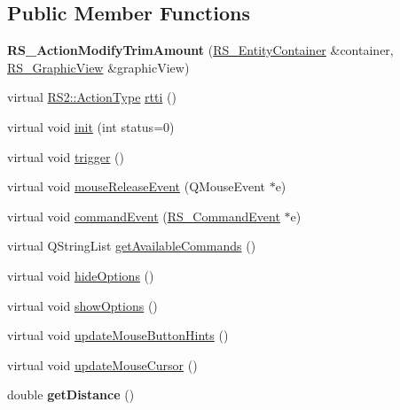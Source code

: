 \subsection*{Public Member Functions}
\begin{DoxyCompactItemize}
\item 
\hypertarget{classRS__ActionModifyTrimAmount_ab89a9caa5cfcbe0cf9898213d8be3d6e}{{\bfseries R\-S\-\_\-\-Action\-Modify\-Trim\-Amount} (\hyperlink{classRS__EntityContainer}{R\-S\-\_\-\-Entity\-Container} \&container, \hyperlink{classRS__GraphicView}{R\-S\-\_\-\-Graphic\-View} \&graphic\-View)}\label{classRS__ActionModifyTrimAmount_ab89a9caa5cfcbe0cf9898213d8be3d6e}

\item 
virtual \hyperlink{classRS2_afe3523e0bc41fd637b892321cfc4b9d7}{R\-S2\-::\-Action\-Type} \hyperlink{classRS__ActionModifyTrimAmount_aaacae253415a0c0adb61dfe0adb77131}{rtti} ()
\item 
virtual void \hyperlink{classRS__ActionModifyTrimAmount_a2789ff760490d0c07a3814beea924528}{init} (int status=0)
\item 
virtual void \hyperlink{classRS__ActionModifyTrimAmount_af29a113ebfe6bda7a078e1f5785af50b}{trigger} ()
\item 
virtual void \hyperlink{classRS__ActionModifyTrimAmount_a7877b87d92a1fc2085cd65249d379230}{mouse\-Release\-Event} (Q\-Mouse\-Event $\ast$e)
\item 
virtual void \hyperlink{classRS__ActionModifyTrimAmount_ad258822293b9d28b9bb1063cdfa89f89}{command\-Event} (\hyperlink{classRS__CommandEvent}{R\-S\-\_\-\-Command\-Event} $\ast$e)
\item 
virtual Q\-String\-List \hyperlink{classRS__ActionModifyTrimAmount_a4661b738d791d0a3444068a8a9d7c41f}{get\-Available\-Commands} ()
\item 
virtual void \hyperlink{classRS__ActionModifyTrimAmount_ae8fa10852fd5d06e747fc63884020e6c}{hide\-Options} ()
\item 
virtual void \hyperlink{classRS__ActionModifyTrimAmount_a7167281fa299ed74d5276970c150af69}{show\-Options} ()
\item 
virtual void \hyperlink{classRS__ActionModifyTrimAmount_a0f9b4411616457f5f5b1b401483cbbd5}{update\-Mouse\-Button\-Hints} ()
\item 
virtual void \hyperlink{classRS__ActionModifyTrimAmount_aa625b9693ad50244498ffe5586239d2e}{update\-Mouse\-Cursor} ()
\item 
\hypertarget{classRS__ActionModifyTrimAmount_a55546c762c189e577a8c1de65320ce0a}{double {\bfseries get\-Distance} ()}\label{classRS__ActionModifyTrimAmount_a55546c762c189e577a8c1de65320ce0a}


\end{DoxyCompactItemize}
